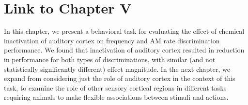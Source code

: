 \section{Link to Chapter V}
In this chapter, we present a behavioral task for evaluating the effect of chemical inactivation of auditory cortex on frequency and AM rate discrimination performance. 
%
We found that inactivation of auditory cortex resulted in reduction in performance for both types of discriminations, with similar (and not statistically significantly different) effect magnitude. 
%
In the next chapter, we expand from considering just the role of auditory cortex in the context of this task, to examine the role of other sensory cortical regions in different tasks requiring animals to make flexible associations between stimuli and actions. 
